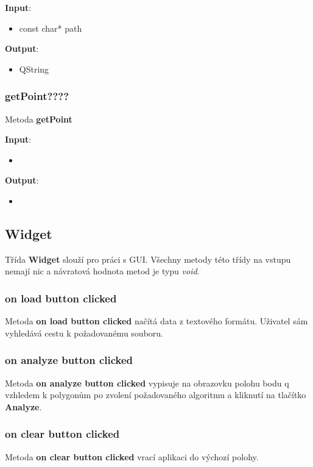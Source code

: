 \documentclass[a4paper, 12pt]{article}
\begin{document}
\textbf{Input}:
\begin{itemize}
\item const char* path
\end{itemize}

\textbf{Output}:
\begin{itemize}
\item QString
\end{itemize}

\subsubsection{getPoint????}
Metoda \textbf{getPoint}

\textbf{Input}:
\begin{itemize}
\item 
\end{itemize}

\textbf{Output}:
\begin{itemize}
\item 
\end{itemize}

\subsection{Widget}
Třída \textbf{Widget} slouží pro práci s GUI. Všechny metody této třídy na vstupu nemají nic a návratová hodnota metod je typu \textsl{void}.

\subsubsection{on load button clicked}
Metoda \textbf{on load button clicked} načítá data z textového formátu. Uživatel sám vyhledává cestu k požadovanému souboru.

\subsubsection{on analyze button clicked}
Metoda \textbf{on analyze button clicked} vypisuje na obrazovku polohu bodu q vzhledem k polygonům po zvolení požadovaného algoritmu a kliknutí na tlačítko \textbf{Analyze}.

\subsubsection{on clear button clicked}
Metoda \textbf{on clear button clicked} vrací aplikaci do výchozí polohy. 

\clearpage
\end{document}
